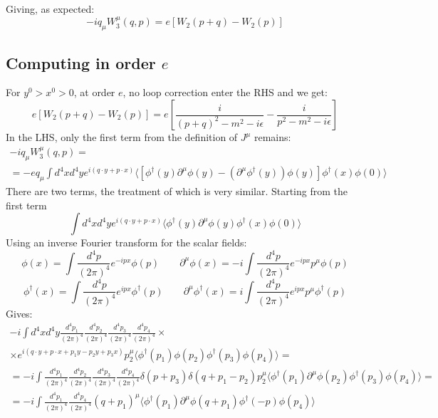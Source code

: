 \documentclass{article}
\begin{document}
Giving, as expected:
\begin{equation}
    -iq_\mu W_3^\mu(q, p) = e\left[W_2(p + q) - W_2(p)\right]
\end{equation}
\subsection{Computing in order $e$}
For $y^0 > x^0 > 0$, at order $e$, no loop correction enter the RHS and we get:
\begin{equation}
    e\left[W_2(p + q) - W_2(p)\right] = e\left[\frac{i}{(p + q)^2 - m^2 - i\epsilon} - \frac{i}{p^2 - m^2 - i\epsilon}\right]
\end{equation}
In the LHS, only the first term from the definition of $J^\mu$ remains:
\begin{equation}
\begin{gathered}
    -iq_\mu W_3^\mu(q, p) = \\ =
    -e q_\mu \int d^4x d^4y e^{i(q\cdot y + p \cdot x)}\langle
        \left[
            \phi^\dagger(y) \partial^\mu \phi(y) - (\partial^\mu \phi^\dagger(y))\phi(y)
        \right] \phi^\dagger(x) \phi(0)
    \rangle
\end{gathered}
\end{equation}
There are two terms, the treatment of which is very similar. Starting from the first term
\begin{equation}
    \int d^4x d^4y e^{i(q\cdot y + p \cdot x)}
    \langle
        \phi^\dagger(y) \partial^\mu \phi(y) \phi^\dagger(x) \phi(0)
    \rangle
\end{equation}
Using an inverse Fourier transform for the scalar fields:
\begin{equation}
    \phi(x) = \int \frac{d^4p}{(2\pi)^4}e^{-ipx} \phi(p)
    \qquad
    \partial^\mu \phi(x) = -i \int \frac{d^4p}{(2\pi)^4} e^{-ipx} p^\mu \phi(p)
\end{equation}
\begin{equation}
    \phi^\dagger(x) = \int \frac{d^4p}{(2\pi)^4}e^{ipx} \phi^\dagger(p)
    \qquad
    \partial^\mu \phi^\dagger(x) = i \int \frac{d^4p}{(2\pi)^4} e^{ipx} p^\mu \phi^\dagger(p)
\end{equation}
Gives:
\begin{equation}
\begin{gathered}
    -i\int d^4x d^4y \frac{d^4p_1}{(2\pi)^4} \frac{d^4p_2}{(2\pi)^4} \frac{d^4p_3}{(2\pi)^4} \frac{d^4p_4}{(2\pi)^4} \times \\ \times
    e^{i(q\cdot y + p \cdot x + p_1 y - p_2 y + p_3 x)}
    p_2^\mu
    \langle
        \phi^\dagger(p_1) \phi(p_2) \phi^\dagger(p_3) \phi(p_4)
    \rangle = \\ =
    -i\int \frac{d^4p_1}{(2\pi)^4} \frac{d^4p_2}{(2\pi)^4} \frac{d^4p_3}{(2\pi)^4} \frac{d^4p_4}{(2\pi)^4}
    \delta(p + p_3)
    \delta(q + p_1 - p_2)
    p_2^\mu
    \langle
        \phi^\dagger(p_1) \partial^\mu \phi(p_2) \phi^\dagger(p_3) \phi(p_4)
    \rangle = \\ =
    -i \int \frac{d^4p_1}{(2\pi)^4} \frac{d^4p_4}{(2\pi)^4}
    (q + p_1)^\mu
    \langle
        \phi^\dagger(p_1) \partial^\mu \phi(q + p_1) \phi^\dagger(-p) \phi(p_4)
    \rangle
\end{gathered}
\end{equation}
\end{document}
